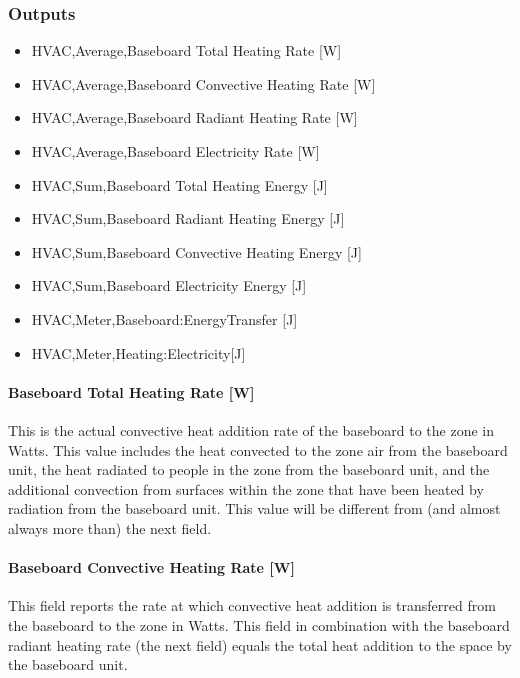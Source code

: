 \subsubsection{Outputs}\label{outputs-2-017}

\begin{itemize}
\item
  HVAC,Average,Baseboard Total Heating Rate {[}W{]}
\item
  HVAC,Average,Baseboard Convective Heating Rate {[}W{]}
\item
  HVAC,Average,Baseboard Radiant Heating Rate {[}W{]}
\item
  HVAC,Average,Baseboard Electricity Rate {[}W{]}
\item
  HVAC,Sum,Baseboard Total Heating Energy {[}J{]}
\item
  HVAC,Sum,Baseboard Radiant Heating Energy {[}J{]}
\item
  HVAC,Sum,Baseboard Convective Heating Energy {[}J{]}
\item
  HVAC,Sum,Baseboard Electricity Energy {[}J{]}
\item
  HVAC,Meter,Baseboard:EnergyTransfer {[}J{]}
\item
  HVAC,Meter,Heating:Electricity{[}J{]}
\end{itemize}

\paragraph{Baseboard Total Heating Rate {[}W{]}}\label{baseboard-total-heating-rate-w-2}

This is the actual convective heat addition rate of the baseboard to the zone in Watts. This value includes the heat convected to the zone air from the baseboard unit, the heat radiated to people in the zone from the baseboard unit, and the additional convection from surfaces within the zone that have been heated by radiation from the baseboard unit. This value will be different from (and almost always more than) the next field.

\paragraph{Baseboard Convective Heating Rate {[}W{]}}\label{baseboard-convective-heating-rate-w-2}

This field reports the rate at which convective heat addition is transferred from the baseboard to the zone in Watts.  This field in combination with the baseboard radiant heating rate (the next field) equals the total heat addition to the space by the baseboard unit.

